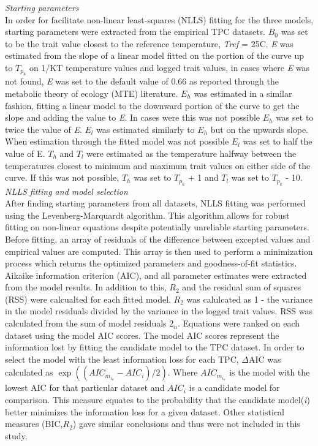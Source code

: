 \documentclass[11pt]{article}
\begin{document}
\noindent
\textit{Starting parameters}\\
In order for facilitate non-linear least-squares (NLLS) fitting for the three models, starting parameters were extracted from the empirical TPC datasets. ${B_0}$ was set to be the trait value closest to the reference temperature, \textit{Tref} = 25\textdegree{}C. \textit{E} was estimated from the slope of a linear model fitted on the portion of the curve up to ${T_p_k}$ on 1/KT temperature values and logged trait values, in cases where \textit{E} was not found, \textit{E} was set to the default value of 0.66 as reported through the metabolic theory of ecology (MTE) literature. ${E_h}$ was estimated in a similar fashion, fitting a linear model to the downward portion of the curve to get the slope and adding the value to \textit{E}. In cases were this was not possible ${E_h}$ was set to twice the value of \textit{E}. ${E_l}$ was estimated similarly to ${E_h}$ but on the upwards slope. When estimation through the fitted model was not possible ${E_l}$ was set to half the value of E. ${T_h}$ and ${T_l}$ were estimated as the temperature halfway between the temperatures closest to minimum and maximum trait values on either side of the curve. If this was not possible, ${T_h}$ was set to
${T_p_k}$ + 1 and ${T_l}$ was set to ${T_p_k}$ - 10.\\

\noindent
\textit{NLLS fitting and model selection}\\
After finding starting parameters from all datasets, NLLS fitting was performed using the Levenberg-Marquardt algorithm. This algorithm allows for robust fitting on non-linear equations despite potentially unreliable starting parameters. Before fitting, an array of residuals of the difference between excepted values and empirical values are computed. This array is then used to perform a minimization process which returns the optimized parameters and goodness-of-fit statistics. Aikaike information criterion (AIC), and all parameter estimates were extracted from the model results. In addition to this, ${R_2}$ and the residual sum of squares (RSS) were calcualted for each fitted model. ${R_2}$ was calulcated as 1 - the variance in the model residuals divided by the variance in the logged trait values. RSS was calculated from the sum of model residuals ${2_n}$. Equations were ranked on each dataset using the model AIC scores. The model AIC scores represent the information lost by fitting the candidate model to the TPC dataset. In order to select the model with the least information loss for each TPC, $\Delta$AIC was calculated as $\exp(({AIC_m_i_n} - {AIC_i})/2)$. Where $AIC_m_i_n$ is the model with the lowest AIC for that particular dataset and $AIC_i$ is a candidate model for comparison. This measure equates to the probability that the candidate model(\textit{i}) better minimizes the information loss for a given dataset\cite{Burnham2011}. Other statistical measures (BIC,${R_2}$) gave similar conclusions and thus were not included in this study.\\
\end{document}
